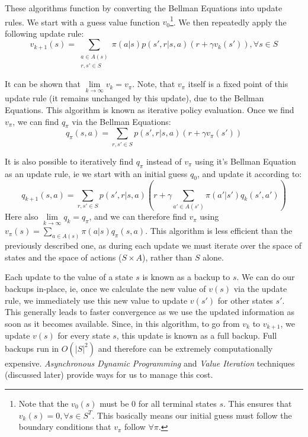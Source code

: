 \documentclass[12pt]{report}
\begin{document}
These algorithms function by converting the Bellman Equations into update rules. We start with a guess value function $v_{0}$\footnote{Note that the $v_{0}(s)$ must be $0$ for all terminal states $s$. This ensures that $v_{k}(s) = 0, \forall s \in S^{T}$. This basically means our initial guess must follow the boundary conditions that $v_{\pi}$ follow $\forall \pi$.}. We then repeatedly apply the following update rule:
\begin{equation}
    v_{k + 1}(s) = \sum\limits_{\substack{a \in A(s)\\r, s' \in S}} \pi(a | s) p(s', r | s, a) (r + \gamma v_{k}(s')), \forall s \in S
\end{equation}

It can be shown that $\lim\limits_{k \rightarrow \infty} v_{k} = v_{\pi}$. Note, that $v_{\pi}$ itself is a fixed point of this update rule (it remains unchanged by this update), due to the Bellman Equations. This algorithm 
is known as iterative policy evaluation. Once we find $v_{\pi}$, we can find $q_{\pi}$ via the Bellman Equations:
\begin{equation}
    q_{\pi}(s, a) = \sum\limits_{r, s' \in S} p(s', r | s, a)(r + \gamma v_{\pi}(s'))
\end{equation}

It is also possible to iteratively find $q_{\pi}$ instead of $v_{\pi}$ using it's Bellman Equation as an update rule, ie we start with an initial guess $q_{0}$, and update it according to:
\begin{equation}
    q_{k + 1}(s, a) = \sum\limits_{r, s' \in S} p(s', r | s, a)(r + \gamma\sum\limits_{a' \in A(s')}\pi(a' | s') q_{k}(s', a'))
\end{equation}
Here also $\lim\limits_{k \rightarrow \infty} q_{k} = q_{\pi}$, and we can therefore find $v_{\pi}$ using $v_{\pi}(s) = \sum\limits_{a \in A(s)} \pi(a | s) q_{\pi}(s, a)$. This algorithm is less efficient than the previously described one, as during each update we must iterate over the space of states and the space of actions ($S \times A$), rather than $S$ alone.

Each update to the value of a state $s$ is known as a backup to $s$. We can do our backups in-place, ie, once we calculate the new value of $v(s)$ via the update rule, we immediately use this new value to update $v(s')$ for other states $s'$. This generally leads to faster convergence as we use the updated information as soon as it becomes available.
Since, in this algorithm, to go from $v_{k}$ to $v_{k + 1}$, we update $v(s)$ for every state $s$, this update is known as a full backup. Full backups run in $O(\left|S\right|^{2})$ and therefore can be extremely computationally expensive. \textit{Asynchronous Dynamic Programming} and \textit{Value Iteration} techniques (discussed later) provide ways for us to manage this cost.
\end{document}
